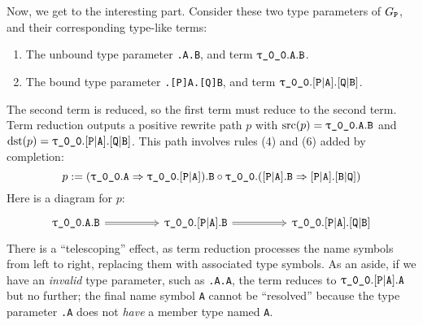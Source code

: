 \documentclass[../generics]{subfiles}
\begin{document}
\begin{example}
Now, we get to the interesting part. Consider these two type parameters of $G_{\texttt{P}}$, and their corresponding type-like terms:
\begin{enumerate}
\item The unbound type parameter \texttt{.A.B}, and term $\ttgp{0}{0}.\texttt{A}.\texttt{B}$.
\item The bound type parameter \texttt{.[P]A.[Q]B}, and term $\ttgp{0}{0}.\assocsym{P}{A}.\assocsym{Q}{B}$.
\end{enumerate}
The second term is reduced, so the first term must reduce to the second term. Term reduction outputs a positive rewrite path $p$ with $\Src(p)=\ttgp{0}{0}.\texttt{A}.\texttt{B}$ and $\Dst(p)=\ttgp{0}{0}.\assocsym{P}{A}.\assocsym{Q}{B}$. This path involves rules (4) and (6) added by completion:
\[
p := (\ttgp{0}{0}.\texttt{A}\Rightarrow\ttgp{0}{0}.\assocsym{P}{A}).\texttt{B} \circ \ttgp{0}{0}.(\assocsym{P}{A}.\texttt{B}\Rightarrow\assocsym{P}{A}.\assocsym{B}{Q})
\]
Here is a diagram for $p$:
\[
\begin{tikzcd}[column sep=huge]
\ttgp{0}{0}.\texttt{A}.\texttt{B}\arrow[r, Rightarrow]&
\ttgp{0}{0}.\assocsym{P}{A}.\texttt{B}\arrow[r, Rightarrow]&
\ttgp{0}{0}.\assocsym{P}{A}.\assocsym{Q}{B}
\end{tikzcd}
\]
There is a ``telescoping'' effect, as term reduction processes the name symbols from left to right, replacing them with associated type symbols. As an aside, if we have an \emph{invalid} type parameter, such as \texttt{.A.A}, the term reduces to $\ttgp{0}{0}.\assocsym{P}{A}.\texttt{A}$ but no further; the final name symbol \texttt{A} cannot be ``resolved'' because the type parameter \texttt{.A} does not \emph{have} a member type named \texttt{A}.


\end{example}
\end{document}
